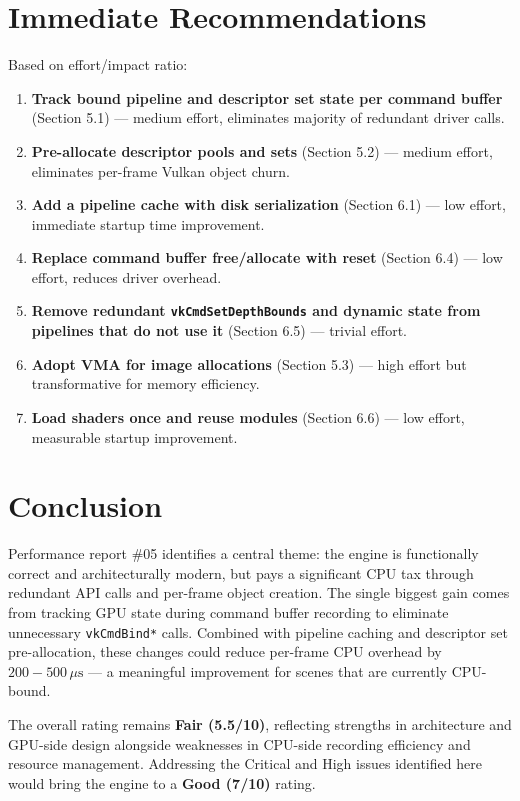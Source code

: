 \documentclass[a4paper,10pt]{article}
\newcommand{\us}{\ensuremath{\,\mu\text{s}}}
\begin{document}
\section{Immediate Recommendations}

Based on effort/impact ratio:

\begin{enumerate}
    \item \textbf{Track bound pipeline and descriptor set state per command
          buffer} (Section 5.1) --- medium effort, eliminates majority of
          redundant driver calls.
    \item \textbf{Pre-allocate descriptor pools and sets} (Section 5.2) ---
          medium effort, eliminates per-frame Vulkan object churn.
    \item \textbf{Add a pipeline cache with disk serialization}
          (Section 6.1) --- low effort, immediate startup time improvement.
    \item \textbf{Replace command buffer free/allocate with reset}
          (Section 6.4) --- low effort, reduces driver overhead.
    \item \textbf{Remove redundant \texttt{vkCmdSetDepthBounds} and dynamic
          state from pipelines that do not use it} (Section 6.5) --- trivial
          effort.
    \item \textbf{Adopt VMA for image allocations} (Section 5.3) --- high
          effort but transformative for memory efficiency.
    \item \textbf{Load shaders once and reuse modules} (Section 6.6) ---
          low effort, measurable startup improvement.
\end{enumerate}

\section{Conclusion}

Performance report \#05 identifies a central theme: the engine is functionally
correct and architecturally modern, but pays a significant CPU tax through
redundant API calls and per-frame object creation. The single biggest gain
comes from tracking GPU state during command buffer recording to eliminate
unnecessary \texttt{vkCmdBind*} calls. Combined with pipeline caching and
descriptor set pre-allocation, these changes could reduce per-frame CPU
overhead by $200{-}500\us$ --- a meaningful improvement for scenes that are
currently CPU-bound.

The overall rating remains \textbf{Fair (5.5/10)}, reflecting strengths in
architecture and GPU-side design alongside weaknesses in CPU-side recording
efficiency and resource management. Addressing the Critical and High issues
identified here would bring the engine to a \textbf{Good (7/10)} rating.
\end{document}
